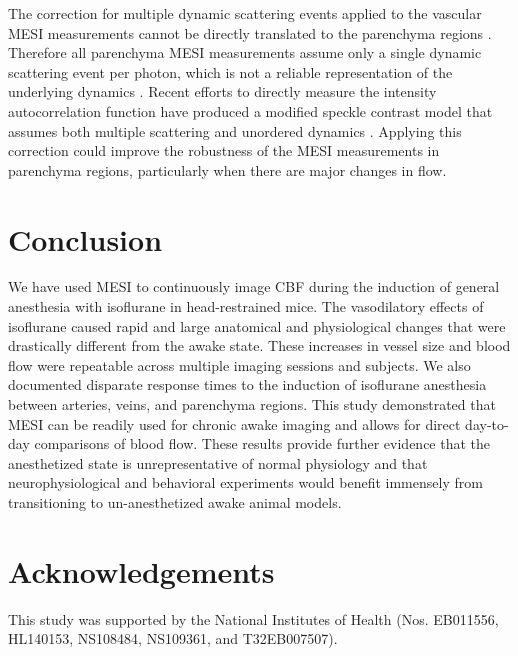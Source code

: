 \documentclass[review]{elsarticle}
\begin{document}
The correction for multiple dynamic scattering events applied to the vascular MESI measurements cannot be directly translated to the parenchyma regions \cite{Kazmi:2015du}. Therefore all parenchyma MESI measurements assume only a single dynamic scattering event per photon, which is not a reliable representation of the underlying dynamics \cite{Davis:2015ij}. Recent efforts to directly measure the intensity autocorrelation function have produced a modified speckle contrast model that assumes both multiple scattering and unordered dynamics \cite{Postnov.2020}. Applying this correction could improve the robustness of the MESI measurements in parenchyma regions, particularly when there are major changes in flow.


\section{Conclusion}

We have used MESI to continuously image CBF during the induction of general anesthesia with isoflurane in head-restrained mice. The vasodilatory effects of isoflurane caused rapid and large anatomical and physiological changes that were drastically different from the awake state. These increases in vessel size and blood flow were repeatable across multiple imaging sessions and subjects. We also documented disparate response times to the induction of isoflurane anesthesia between arteries, veins, and parenchyma regions. This study demonstrated that MESI can be readily used for chronic awake imaging and allows for direct day-to-day comparisons of blood flow. These results provide further evidence that the anesthetized state is unrepresentative of normal physiology and that neurophysiological and behavioral experiments would benefit immensely from transitioning to un-anesthetized awake animal models.



\section*{Acknowledgements}
This study was supported by the National Institutes of Health (Nos. EB011556, HL140153, NS108484, NS109361, and T32EB007507).
\end{document}
